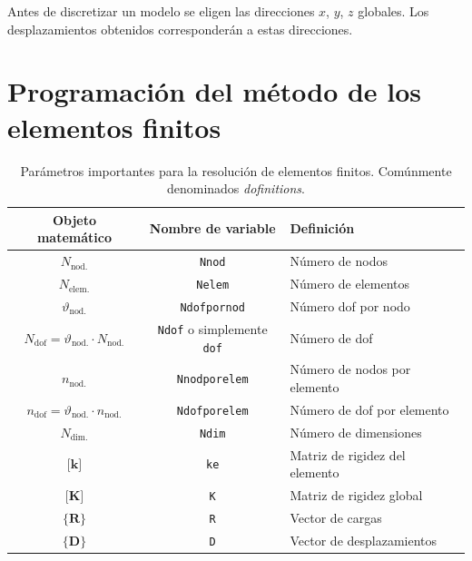 \documentclass[11pt, a4paper,titlepage]{article}
\newcommand{\Mme}[1]{\boldsymbol{[}\mathbf{#1} \boldsymbol{]}}
\newcommand{\Cme}[1]{\boldsymbol{\{ }\mathbf{#1} \boldsymbol{\}} }
\newcommand{\CD}{\Cme{D}}
\newcommand{\MK}{\Mme{K}}
\newcommand{\Mk}{\Mme{k}}
\newcommand{\CRext}{\Cme{R^{\mathrm{ext.}}}}
\newcommand{\CR}{\Cme{R}}
\begin{document}
Antes de discretizar un modelo se eligen las direcciones $x$, $y$, $z$ globales. Los desplazamientos obtenidos corresponderán a estas direcciones.

\part{Programación del método de los elementos finitos}

\newcommand{\Numberof}{N}
\newcommand{\Numberlocal}{n}
\newcommand{\DOF}{\vartheta}
\newcommand{\Nnod}{\ensuremath{\Numberof_{\mathrm{nod.}}}}
\newcommand{\Ndims}{\ensuremath{\Numberof_{\mathrm{dim.}}}}
\newcommand{\Nelem}{\ensuremath{\Numberof_{\mathrm{elem.}}}}
\newcommand{\Ndofpornod}{\ensuremath{\DOF_{\mathrm{nod.}}}}
\newcommand{\Ndof}{\ensuremath{\Numberof_{\mathrm{dof}}}}

\newcommand{\Nnodporelem}{\ensuremath{\Numberlocal_{\mathrm{nod.}}}}
\newcommand{\Ndofporelem}{\ensuremath{\Numberlocal_{\mathrm{dof}}}}

\begin{table}[htb!]
	\centering
	\begin{tabular}{ccl}
		Objeto matemático & Nombre de variable & Definición \\ \hline
	\Nnod	& \texttt{Nnod}                   &    Número de nodos        \\
	\Nelem	& \texttt{Nelem}                   &    Número de elementos       \\
	\Ndofpornod	& \texttt{Ndofpornod}                   &    Número dof por nodo       \\
	$\Ndof=\Ndofpornod \cdot \Nnod$	& \texttt{Ndof} {\footnotesize{}o simplemente} \texttt{dof}                   &    Número de dof        \\
	\Nnodporelem	& \texttt{Nnodporelem}                   &    Número de nodos por elemento     \\
	$\Ndofporelem= \Ndofpornod \cdot \Nnodporelem$	& \texttt{Ndofporelem}                   &    Número de dof por elemento       \\
	\Ndims	& \texttt{Ndim}                   &    Número de dimensiones      \\
	$\Mk$	& \texttt{ke}                   &   Matriz de rigidez del elemento      \\
	$\MK$	& \texttt{K}                   &   Matriz de rigidez global      \\
	$\CR$   & \texttt{R}                  &  Vector de cargas \\
	$\CD$   & \texttt{D}                 & Vector de desplazamientos \\
	\end{tabular}

\caption{Parámetros importantes para la resolución de elementos finitos. Comúnmente denominados \textit{dofinitions}.}
\label{tab:VariableDefinitions}
\end{table}
\end{document}
